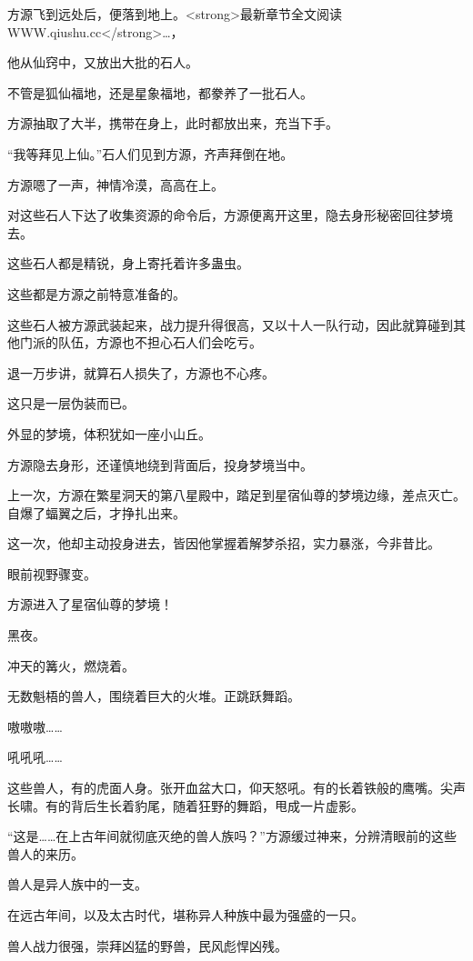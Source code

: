 
\begin{this_body}

方源飞到远处后，便落到地上。<strong>最新章节全文阅读WWW.qiushu.cc</strong>…，

他从仙窍中，又放出大批的石人。

不管是狐仙福地，还是星象福地，都豢养了一批石人。

方源抽取了大半，携带在身上，此时都放出来，充当下手。

“我等拜见上仙。”石人们见到方源，齐声拜倒在地。

方源嗯了一声，神情冷漠，高高在上。

对这些石人下达了收集资源的命令后，方源便离开这里，隐去身形秘密回往梦境去。

这些石人都是精锐，身上寄托着许多蛊虫。

这些都是方源之前特意准备的。

这些石人被方源武装起来，战力提升得很高，又以十人一队行动，因此就算碰到其他门派的队伍，方源也不担心石人们会吃亏。

退一万步讲，就算石人损失了，方源也不心疼。

这只是一层伪装而已。

外显的梦境，体积犹如一座小山丘。

方源隐去身形，还谨慎地绕到背面后，投身梦境当中。

上一次，方源在繁星洞天的第八星殿中，踏足到星宿仙尊的梦境边缘，差点灭亡。自爆了蝠翼之后，才挣扎出来。

这一次，他却主动投身进去，皆因他掌握着解梦杀招，实力暴涨，今非昔比。

眼前视野骤变。

方源进入了星宿仙尊的梦境！

黑夜。

冲天的篝火，燃烧着。

无数魁梧的兽人，围绕着巨大的火堆。正跳跃舞蹈。

嗷嗷嗷……

吼吼吼……

这些兽人，有的虎面人身。张开血盆大口，仰天怒吼。有的长着铁般的鹰嘴。尖声长啸。有的背后生长着豹尾，随着狂野的舞蹈，甩成一片虚影。

“这是……在上古年间就彻底灭绝的兽人族吗？”方源缓过神来，分辨清眼前的这些兽人的来历。

兽人是异人族中的一支。

在远古年间，以及太古时代，堪称异人种族中最为强盛的一只。

兽人战力很强，崇拜凶猛的野兽，民风彪悍凶残。


\end{this_body}
